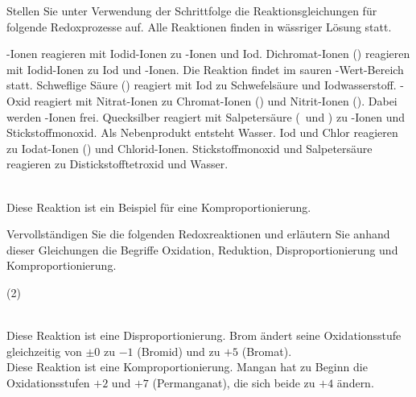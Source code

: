 \documentclass{scrartcl}
\begin{document}
\begin{question}
  Stellen Sie unter Verwendung der Schrittfolge die Reaktionsgleichungen für
  folgende Redoxprozesse auf. Alle Reaktionen finden in wässriger Lösung
  statt.
  \begin{tasks}
    \task {}-Ionen reagieren mit Iodid-Ionen zu -Ionen und Iod.
    \task Dichromat-Ionen () reagieren mit Iodid-Ionen zu Iod und
      -Ionen. Die Reaktion findet im sauren \pH-Wert-Bereich statt.
    \task Schweflige Säure () reagiert mit Iod zu Schwefelsäure und
      Iodwasserstoff.
    \task {}-Oxid reagiert mit Nitrat-Ionen zu Chromat-Ionen ()
      und Nitrit-Ionen (). Dabei werden \Hpl-Ionen frei.
    \task Quecksilber reagiert mit Salpetersäure (\Hpl\ und ) zu
      -Ionen und Stickstoffmonoxid. Als Nebenprodukt entsteht Wasser.
    \task Iod und Chlor reagieren zu Iodat-Ionen () und Chlorid-Ionen.
    \task Stickstoffmonoxid und Salpetersäure reagieren zu Distickstofftetroxid und
      Wasser.
  \end{tasks}
\end{question}
\begin{solution}
  \begin{tasks}
    \task {}
    \task {}
    \task {}
    \task {}
    \task {}
    \task {}
    \task {}\\
      Diese Reaktion ist ein Beispiel für eine Komproportionierung.
  \end{tasks}
\end{solution}

\begin{question}
  Vervollständigen Sie die folgenden Redoxreaktionen und erläutern Sie anhand
  dieser Gleichungen die Begriffe Oxidation, Reduktion, Disproportionierung
  und Komproportionierung.
  \begin{tasks}(2)
     \task {}
     \task {}
  \end{tasks}
\end{question}
\begin{solution}
  \begin{tasks}
    \task {}\\
      Diese Reaktion ist eine Disproportionierung. Brom ändert seine
      Oxidationsstufe gleichzeitig von $\pm0$ zu $-1$ (Bromid) und zu
      $+5$ (Bromat).
    \task {}\\
      Diese Reaktion ist eine Komproportionierung. Mangan hat zu Beginn die
      Oxidationsstufen $+2$ und $+7$ (Permanganat), die sich beide zu $+4$
      ändern.
  \end{tasks}
\end{solution}
\end{document}

